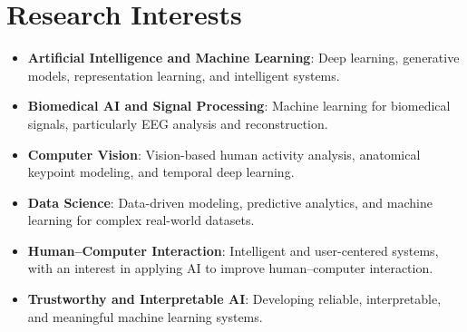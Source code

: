 \section{Research Interests}

\begin{itemize}

    \item \textbf{Artificial Intelligence and Machine Learning}: Deep learning, generative models, representation learning, and intelligent systems.

    \item \textbf{Biomedical AI and Signal Processing}: Machine learning for biomedical signals, particularly EEG analysis and reconstruction.

    \item \textbf{Computer Vision}: Vision-based human activity analysis, anatomical keypoint modeling, and temporal deep learning.

    \item \textbf{Data Science}: Data-driven modeling, predictive analytics, and machine learning for complex real-world datasets.

    \item \textbf{Human--Computer Interaction}: Intelligent and user-centered systems, with an interest in applying AI to improve human--computer interaction.

    \item \textbf{Trustworthy and Interpretable AI}: Developing reliable, interpretable, and meaningful machine learning systems.

\end{itemize}

\endinput